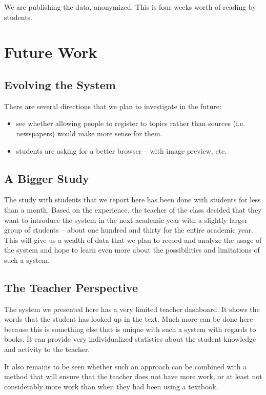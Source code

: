We are publishing the data, anonymized. This is four weeks worth of reading by \stcnt students.


\section{Future Work}


\subsection{Evolving the System}
There are several directions that we plan to investigate in the future: 

\begin{itemize}

	\item see whether allowing people to register to topics rather than sources (i.e. newspapers) would make more sense for them. 

	\item students are asking for a better browser -- with image preview, etc.

\end{itemize}

\subsection{A Bigger Study}
The study with students that we report here has been done with \stcnt students for less than a month. Based on the experience, the teacher of the class decided that they want to introduce the system in the next academic year with a slightly larger group of students -- about one hundred and thirty for the entire academic year. This will give us a wealth of data that we plan to record and analyze the usage of the system and hope to learn even more about the possibilities and limitations of such a system. 

\subsection{The Teacher Perspective}
The system we presented here has a very limited teacher dashboard. It shows the words that the student has looked up in the text. Much more can be done here because this is something else that is unique with such a system with regards to books. It can provide very individualized statistics about the student knowledge and activity to the teacher. 

It also remains to be seen whether such an approach can be combined with a method that will ensure that the teacher does not have more work, or at least not considerably more work than when they had been using a textbook. 

